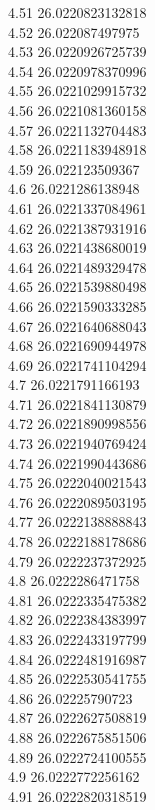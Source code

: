 {4.51	26.0220823132818\\
4.52	26.022087497975\\
4.53	26.0220926725739\\
4.54	26.0220978370996\\
4.55	26.0221029915732\\
4.56	26.0221081360158\\
4.57	26.0221132704483\\
4.58	26.0221183948918\\
4.59	26.022123509367\\
4.6	26.0221286138948\\
4.61	26.0221337084961\\
4.62	26.0221387931916\\
4.63	26.0221438680019\\
4.64	26.0221489329478\\
4.65	26.0221539880498\\
4.66	26.0221590333285\\
4.67	26.0221640688043\\
4.68	26.0221690944978\\
4.69	26.0221741104294\\
4.7	26.0221791166193\\
4.71	26.0221841130879\\
4.72	26.0221890998556\\
4.73	26.0221940769424\\
4.74	26.0221990443686\\
4.75	26.0222040021543\\
4.76	26.0222089503195\\
4.77	26.0222138888843\\
4.78	26.0222188178686\\
4.79	26.0222237372925\\
4.8	26.0222286471758\\
4.81	26.0222335475382\\
4.82	26.0222384383997\\
4.83	26.0222433197799\\
4.84	26.0222481916987\\
4.85	26.0222530541755\\
4.86	26.02225790723\\
4.87	26.0222627508819\\
4.88	26.0222675851506\\
4.89	26.0222724100555\\
4.9	26.0222772256162\\
4.91	26.0222820318519\\
}
